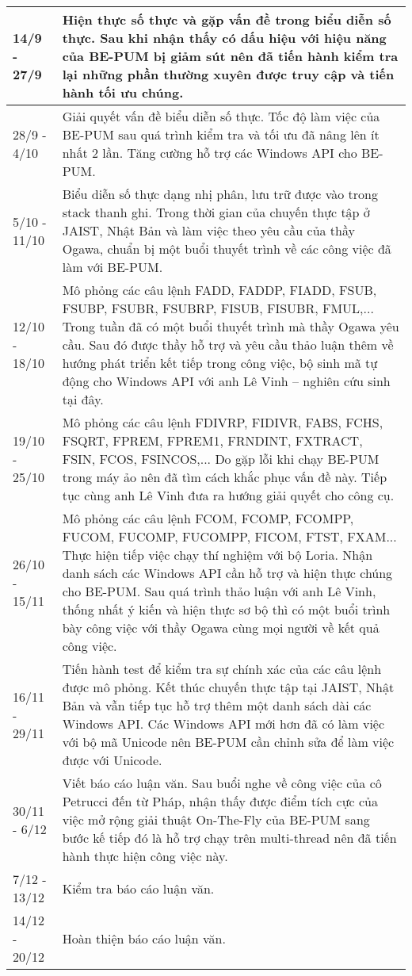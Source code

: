 \begin{longtable}{|l|m{11cm}|}
		\hline	
			14/9 - 27/9	& Hiện thực số thực và gặp vấn đề trong biểu diễn số thực. Sau khi nhận thấy có dấu hiệu với hiệu năng của BE-PUM bị giảm sút nên đã tiến hành kiểm tra lại những phần thường xuyên được truy cập và tiến hành tối ưu chúng.\\
		\hline	
			28/9 - 4/10&	Giải quyết vấn đề biểu diễn số thực. Tốc độ làm việc của BE-PUM sau quá trình kiểm tra và tối ưu đã nâng lên ít nhất 2 lần. Tăng cường hỗ trợ các Windows API cho BE-PUM.\\
		\hline	
			5/10 - 11/10&	Biểu diễn số thực dạng nhị phân, lưu trữ được vào trong stack thanh ghi. Trong thời gian của chuyến thực tập ở JAIST, Nhật Bản và làm việc theo yêu cầu của thầy Ogawa, chuẩn bị một buổi thuyết trình về các công việc đã làm với BE-PUM.\\
		\hline	
			12/10 - 18/10&	Mô phỏng các câu lệnh FADD, FADDP, FIADD, FSUB, FSUBP, FSUBR, FSUBRP, FISUB, FISUBR, FMUL,... Trong tuần đã có một buổi thuyết trình mà thầy Ogawa yêu cầu. Sau đó được thầy hỗ trợ và yêu cầu thảo luận thêm về hướng phát triển kết tiếp trong công việc, bộ sinh mã tự động cho Windows API với anh Lê Vinh -- nghiên cứu sinh tại đây.\\
		\hline	
			19/10 - 25/10&	Mô phỏng các câu lệnh  FDIVRP, FIDIVR, FABS, FCHS, FSQRT, FPREM, FPREM1, FRNDINT, FXTRACT, FSIN, FCOS, FSINCOS,... Do gặp lỗi khi chạy BE-PUM trong máy ảo nên đã tìm cách khắc phục vấn đề này. Tiếp tục cùng anh Lê Vinh đưa ra hướng giải quyết cho công cụ.\\
		\hline
			26/10 - 15/11	& Mô phỏng các câu lệnh FCOM, FCOMP, FCOMPP, FUCOM, FUCOMP, FUCOMPP, FICOM,  FTST, FXAM... Thực hiện tiếp việc chạy thí nghiệm với bộ Loria. Nhận danh sách các Windows API cần hỗ trợ và hiện thực chúng cho BE-PUM. Sau quá trình thảo luận với anh Lê Vinh, thống nhất ý kiến và hiện thực sơ bộ thì có một buổi trình bày công việc với thầy Ogawa cùng mọi người về kết quả công việc.\\		
		\hline	
			16/11 - 29/11&	Tiến hành test để kiểm tra sự chính xác của các câu lệnh được mô phỏng. Kết thúc chuyến thực tập tại JAIST, Nhật Bản và vẫn tiếp tục hỗ trợ thêm một danh sách dài các Windows API. Các Windows API mới hơn đã có làm việc với bộ mã Unicode nên BE-PUM cần chỉnh sửa để làm việc được với Unicode.\\
		\hline	
			30/11 - 6/12	& Viết báo cáo luận văn. Sau buổi nghe về công việc của cô Petrucci đến từ Pháp, nhận thấy được điểm tích cực của việc mở rộng giải thuật On-The-Fly của BE-PUM sang bước kế tiếp đó là hỗ trợ chạy trên multi-thread nên đã tiến hành thực hiện công việc này.\\
		\hline	
			7/12 - 13/12	& Kiểm tra báo cáo luận văn.\\
		\hline	
			14/12 - 20/12&	Hoàn thiện báo cáo luận văn.\\
		\hline
	\end{longtable}